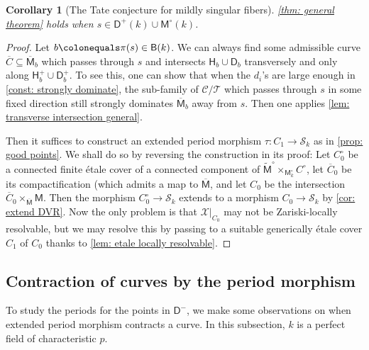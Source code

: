 \documentclass[11pt, letterpaper]{amsart}
\theoremstyle{plain}
\newtheorem{corollary}[theorem]{Corollary}
\theoremstyle{definition}
\newcommand{\<}{\langle}
\renewcommand{\>}{\rangle}
\def\wt{\widetilde}
\newcommand{\shS}{\mathscr{S}}
\newcommand{\sfD}{\mathsf{D}}
\newcommand{\sfM}{\mathsf{M}}
\newcommand{\sX}{\mathcal{X}}
\newcommand{\sT}{\mathcal{T}}
\newcommand{\sfH}{\mathsf{H}}
\newcommand{\sfB}{\mathsf{B}}
\newcommand{\shC}{\mathscr{C}}
\begin{document}
\begin{corollary}[The Tate conjecture for mildly singular fibers]
\label{cor: good points}
    \cref{thm: general theorem} holds when $s \in \sfD^+(k) \cup \sfM^\circ(k)$. 
\end{corollary}
\begin{proof}
    Let $b \colonequals \pi(s)\in \sfB(k)$. 
    We can always find some admissible curve $\overline{C} \subseteq \overline{\sfM}_b$ which passes through $s$ and intersects $\sfH_b \cup \sfD_b$ transversely and only along $\sfH^+_b \cup \sfD^+_b$. 
    To see this, one can show that when the $d_i$'s are large enough in \cref{const: strongly dominate}, the sub-family of $\shC/\sT$ which passes through $s$ in some fixed direction still strongly dominates $\overline{\sfM}_b$ away from $s$. 
    Then one applies \cref{lem: transverse intersection general}. 
    
    Then it suffices to construct an extended period morphism $\tau : C_1 \to \shS_k$ as in \cref{prop: good points}. We shall do so by reversing the construction in its proof: 
    Let $C_0^\circ$ be a connected finite \'etale cover of a connected component of $\wt{\sfM}^\circ \times_{\sfM^\circ_k} C^\circ$, let $\overline{C}_0$ be its compactification (which admits a map to $\overline{\sfM}$, and let $C_0 $ be the intersection $\overline{C}_0 \times_{\overline{\sfM}} \sfM$.
    Then the morphism $C^\circ_0 \to \shS_k$ extends to a morphism $C_0 \to \shS_k$ by \cref{cor: extend DVR}. 
    Now the only problem is that $\sX|_{C_0}$ may not be Zariski-locally resolvable, but we may resolve this by passing to a suitable generically \'etale cover $C_1$ of $C_0$ thanks to \cref{lem: etale locally resolvable}.
\end{proof}


\subsection{Contraction of curves by the period morphism}

To study the periods for the points in $\sfD^-$, we make some observations on when extended period morphism contracts a curve. In this subsection, $k$ is a perfect field of characteristic $p$. 
\end{document}
